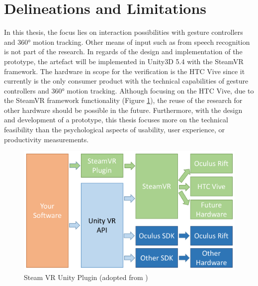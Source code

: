 



\section{Delineations and Limitations}

In this thesis, the focus lies on interaction possibilities with gesture controllers and 360° motion tracking. Other means of input such as from speech recognition is not part of the research.
In regards of the design and implementation of the prototype, the artefact will be implemented in Unity3D 5.4 with the SteamVR framework. The hardware in scope for the verification is the HTC Vive since it currently is the only consumer product with the  technical capabilities of gesture controllers and 360° motion tracking. Although focusing on the HTC Vive, due to the SteamVR framework functionality (Figure \ref{fig:steamvr}), the reuse of the research for other hardware should be possible in the future. \newline
Furthermore, with the design and development of a prototype, this thesis focuses more on the technical feasibility than the psychological aspects of usability, user experience, or productivity measurements. 
\begin{figure}[h]
	\begin{center}
		\includegraphics[width=14cm]{03_Figures/04_Valve/OpenVR_SteamVR.png}
		\caption[Steam VR Unity Plugin]{Steam VR Unity Plugin (adopted from \cite{Valve2016})}
		\label{fig:steamvr}
	\end{center}
\end{figure}


